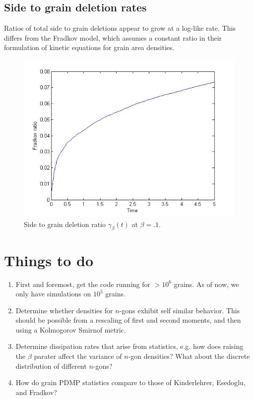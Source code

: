 \documentclass{amsart}
\begin{document}
\subsection{Side to grain deletion rates}
Ratios of total side to grain deletions appear to grow at a log-like rate.  This differs from the Fradkov model, which assumes a constant ratio in their  formulation of kinetic equations for grain area densities.
 \begin{figure}
        \includegraphics[width=.5\textwidth]{coarseratiobetatenth.jpg}
        \caption{Side to grain deletion ratio $\gamma_\beta(t)$ at $\beta=.1$.}
 \end{figure}       
        

\section{Things to do}

\begin{enumerate}
\item  First and foremost, get the code running for $>10^6$ grains.  As of now, we only have simulations on $10^5$ grains.
\item  Determine whether densities for $n$-gons exhibit self similar behavior. This should be possible from a rescaling of first and second moments, and then using a Kolmogorov Smirnof metric.
\item Determine dissipation rates that arise from statistics, e.g. how does raising the $\beta$ parater affect the variance of $n$-gon densities?  What about the discrete  distribution of different $n$-gons?
\item How do grain PDMP statistics compare to those of Kinderlehrer, Esedoglu, and Fradkov?  
\end{enumerate}
 
 
\end{document}
